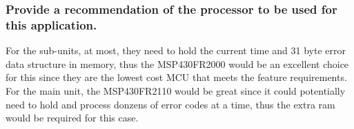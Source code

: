 \documentclass[12pt]{article} \usepackage{jeep} \usepackage{unicode}
\begin{document}
\subsubsection{Provide a recommendation of the processor to be used for this application.}
For the sub-units, at most, they need to hold the current time and 31 byte error data
structure in memory, thus the MSP430FR2000 would be an excellent choice for this
since they are the lowest cost MCU that meets the feature requirements. For the
main unit, the MSP430FR2110 would be great since it could potentially need to
hold and process donzens of error codes at a time, thus the extra ram would be
required for this case.
\end{document}
